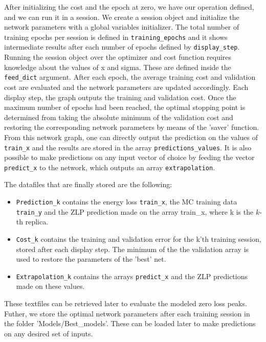 \begin{itemize}
After initializing the cost and the epoch at zero, we have our operation defined, and we can run it in a session. 
%
We create a session object and initialize the network parameters with a global variables initializer.
%
The total number of training epochs per session is defined in {\tt training\_epochs} and it shows intermediate 
results after each number of epochs defined by {\tt display\_step}. 
%
Running the session object over the optimizer and cost function requires knowledge about the values of x and sigma. 
These are defined inside the {\tt feed\_dict} argument. 
%
After each epoch, the average training cost and validation cost are evaluated and the network parameters 
are updated accordingly.
%
Each display step, the graph outputs the training and validation cost. 
Once the maximum number of epochs 
had been reached, the optimal stopping point is determined from 
taking the absolute minimum of the validation cost
and restoring the corresponding network parameters by means of the 'saver' function.
%
From this network graph, one can directly output the prediction on the values of {\tt train\_x} and
the results are stored in the array {\tt predictions\_values}.
%
It is also possible to make predictions on any input vector of choice by feeding 
the vector {\tt predict\_x} to the 
network, which outputs an array {\tt extrapolation}.

\end{itemize}

The datafiles that are finally stored are the following:

\begin{itemize}

\item {\tt Prediction\_k} contains the energy loss {\tt train\_x}, the MC training data {\tt train\_y}
and the ZLP prediction made on the array train\_x, where k is the $k$-th replica. 
\item {\tt Cost\_k} contains the training and validation error for the k'th training session, 
stored after each display step. 
The minimum of the the validation array is used to restore the parameters of the 'best' net.
\item {\tt Extrapolation\_k} contains the arrays {\tt predict\_x} and the ZLP predictions made on these values. 
\end{itemize}
These textfiles can be retrieved later to evaluate the modeled zero loss peaks.
%
Futher, we store the optimal network parameters after each training session in the folder
'Models/Best\_models'. 
%
These can be loaded later to make predictions on any desired set of inputs. 


